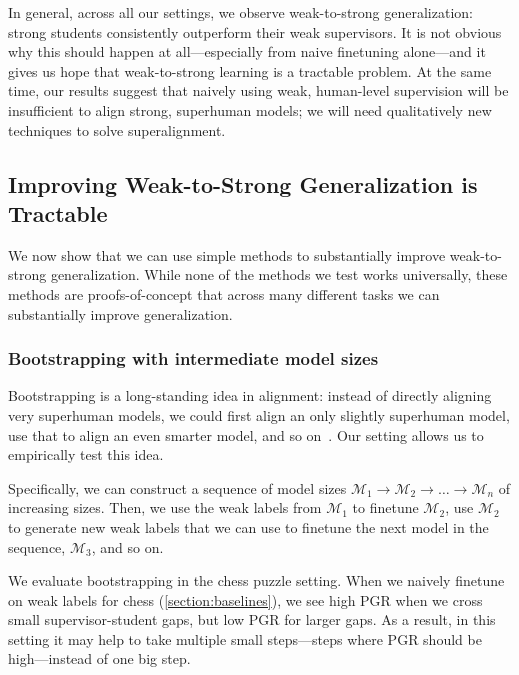 In general, across all our settings, we observe weak-to-strong generalization: strong students consistently outperform their weak supervisors. It is not obvious why this should happen at all---especially from naive finetuning alone---and it gives us hope that weak-to-strong learning is a tractable problem. At the same time, our results suggest that naively using weak, human-level supervision will be insufficient to align strong, superhuman models; we will need qualitatively new techniques to solve superalignment.

\subsection{Improving Weak-to-Strong Generalization is Tractable}
\label{sec:method}

We now show that we can use simple methods to substantially improve weak-to-strong generalization. While none of the methods we test works universally, these methods are proofs-of-concept that across many different tasks we can substantially improve generalization.

\subsubsection{Bootstrapping with intermediate model sizes}
\label{sec:bootstrapping}

Bootstrapping is a long-standing idea in alignment: instead of directly aligning very superhuman models, we could first align an only slightly superhuman model, use that to align an even smarter model, and so on~\citep{christiano2019capability,
 christiano2018approval, superalignment, worley2021bootstrapped}. Our setting allows us to empirically test this idea.

Specifically, we can construct a sequence of model sizes $\mathcal{M}_1 \rightarrow \mathcal{M}_2 \rightarrow \ldots \rightarrow \mathcal{M}_n$ of increasing sizes. Then, we use the weak labels from $\mathcal{M}_1$ to finetune $\mathcal{M}_2$, use $\mathcal{M}_2$ to generate new weak labels that we can use to finetune the next model in the sequence, $\mathcal{M}_3$, and so on.

We evaluate bootstrapping in the chess puzzle setting. When we naively finetune on weak labels for chess (\ref{section:baselines}), 
we see high PGR when we cross small supervisor-student gaps, but low PGR for larger gaps. As a result, in this setting it may help to take multiple small steps---steps where PGR should be high---instead of one big step.

